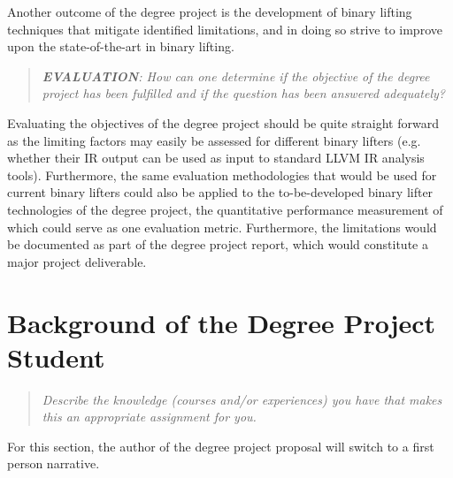 \documentclass[12pt, a4paper]{article}
\begin{document}
Another outcome of the degree project is the development of binary lifting techniques that mitigate identified limitations, and in doing so strive to improve upon the state-of-the-art in binary lifting.

\begin{quote}
	\textit{\textbf{EVALUATION}: How can one determine if the objective of the degree project has been fulfilled and if the question has been answered adequately?}
\end{quote}

Evaluating the objectives of the degree project should be quite straight forward as the limiting factors may easily be assessed for different binary lifters (e.g. whether their IR output can be used as input to standard LLVM IR analysis tools). Furthermore, the same evaluation methodologies that would be used for current binary lifters could also be applied to the to-be-developed binary lifter technologies of the degree project, the quantitative performance measurement of which could serve as one evaluation metric. Furthermore, the limitations would be documented as part of the degree project report, which would constitute a major project deliverable.

\section{Background of the Degree Project Student}

\begin{quote}
	\textit{\textit{Describe the knowledge (courses and/or experiences) you have that makes this an appropriate assignment for you.}}
\end{quote}

For this section, the author of the degree project proposal will switch to a first person narrative.
\end{document}

